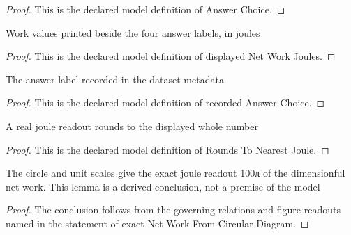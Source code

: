 \begin{proof}
  This is the declared model definition of Answer Choice.
\end{proof}
\begin{definition}
  \label{def:physics:phyx-mini-0357:phyxminiproblems-problemphyxmini0357-displayednetworkjoules}
  Work values printed beside the four answer labels, in joules
\end{definition}
\begin{proof}
  This is the declared model definition of displayed Net Work Joules.
\end{proof}
\begin{definition}
  \label{def:physics:phyx-mini-0357:phyxminiproblems-problemphyxmini0357-recordedanswerchoice}
  The answer label recorded in the dataset metadata
\end{definition}
\begin{proof}
  This is the declared model definition of recorded Answer Choice.
\end{proof}
\begin{definition}
  \label{def:physics:phyx-mini-0357:phyxminiproblems-problemphyxmini0357-roundstonearestjoule}
  A real joule readout rounds to the displayed whole number
\end{definition}
\begin{proof}
  This is the declared model definition of Rounds To Nearest Joule.
\end{proof}
\begin{lemma}
  \label{lem:physics:phyx-mini-0357:phyxminiproblems-problemphyxmini0357-exactnetworkfromcirculardiagram}
  The circle and unit scales give the exact joule readout 100π of the dimensionful net work. This lemma is a derived conclusion, not a premise of the model
\end{lemma}
\begin{proof}
  The conclusion follows from the governing relations and figure readouts named in the statement of exact Net Work From Circular Diagram.
\end{proof}
